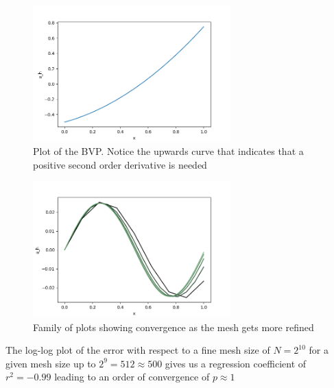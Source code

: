 

\begin{figure}[H]
	\centering
	\includegraphics[width=0.68\textwidth]{Documentation/Figures/a05ex02c.png} 
	\caption{Plot of the BVP. Notice the upwards curve that indicates that a positive second order derivative is needed }
	\label{fig:a05ex01domain2}
\end{figure}


\begin{figure}[H]
	\centering
	\includegraphics[width=0.68\textwidth]{Documentation/Figures/a05ex02d.png} 
	\caption{Family of plots showing convergence as the mesh gets more refined }
	\label{fig:a05ex01domain2}
\end{figure}


The log-log plot of the error with respect to a fine mesh size of $N=2^10$ for a given mesh size up to $2^9=512 \approx 500$ gives us a regression coefficient of $r^2=-0.99$ leading to an order of convergence of $p \approx 1$

